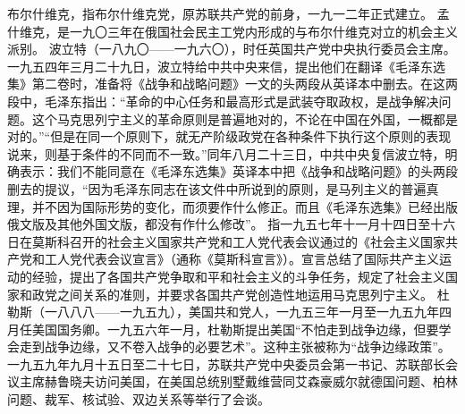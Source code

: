 \begin{maonote}
布尔什维克，指布尔什维克党，原苏联共产党的前身，一九一二年正式建立。
孟什维克，是一九〇三年在俄国社会民主工党内形成的与布尔什维克对立的机会主义派别。
波立特（一八九〇——一九六〇），时任英国共产党中央执行委员会主席。
一九五四年三月二十九日，波立特给中共中央来信，提出他们在翻译《毛泽东选集》第二卷时，准备将《战争和战略问题》一文的头两段从英译本中删去。在这两段中，毛泽东指出：“革命的中心任务和最高形式是武装夺取政权，是战争解决问题。这个马克思列宁主义的革命原则是普遍地对的，不论在中国在外国，一概都是对的。”“但是在同一个原则下，就无产阶级政党在各种条件下执行这个原则的表现说来，则基于条件的不同而不一致。”同年八月二十三日，中共中央复信波立特，明确表示：我们不能同意在《毛泽东选集》英译本中把《战争和战略问题》的头两段删去的提议，“因为毛泽东同志在该文件中所说到的原则，是马列主义的普遍真理，并不因为国际形势的变化，而须要作什么修正。而且《毛泽东选集》已经出版俄文版及其他外国文版，都没有作什么修改”。
指一九五七年十一月十四日至十六日在莫斯科召开的社会主义国家共产党和工人党代表会议通过的《社会主义国家共产党和工人党代表会议宣言》（通称《莫斯科宣言》）。宣言总结了国际共产主义运动的经验，提出了各国共产党争取和平和社会主义的斗争任务，规定了社会主义国家和政党之间关系的准则，并要求各国共产党创造性地运用马克思列宁主义。
杜勒斯（一八八八——一九五九），美国共和党人，一九五三年一月至一九五九年四月任美国国务卿。一九五六年一月，杜勒斯提出美国“不怕走到战争边缘，但要学会走到战争边缘，又不卷入战争的必要艺术”。这种主张被称为“战争边缘政策”。
一九五九年九月十五日至二十七日，苏联共产党中央委员会第一书记、苏联部长会议主席赫鲁晓夫访问美国，在美国总统别墅戴维营同艾森豪威尔就德国问题、柏林问题、裁军、核试验、双边关系等举行了会谈。
\end{maonote}
